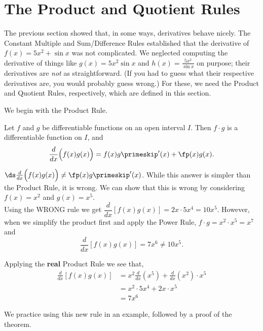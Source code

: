 \section{The Product and Quotient Rules}\label{sec:prod_quot_rules}

The previous section showed that, in some ways, derivatives behave nicely. The Constant Multiple and Sum/Difference Rules established that the derivative of $f(x) = 5x^2+\sin x $ was not complicated. We neglected computing the derivative of things like $g(x) = 5x^2\sin x$ and $h(x) = \frac{5x^2}{\sin x}$ on purpose; their derivatives are \emph{not} as straightforward. (If you had to guess what their respective derivatives are, you would probably guess wrong.) For these, we need the Product and Quotient Rules, respectively, which are defined in this section. 

We begin with the Product Rule.

\begin{theorem}\label{thm:ProductRule}
Let $f$ and $g$ be differentiable functions on an open interval $I$. Then $f\cdot g$ is a differentiable function on $I$, and \[\frac{d}{dx}\Bigl(f(x)g(x)\Bigr) = f(x)g\primeskip'(x) + \fp(x)g(x).\]
\end{theorem}

 $\ds\frac{d}{dx}\Bigl(f(x)g(x)\Bigr) \neq \fp(x)g\primeskip'(x)$. While this answer is simpler than the Product Rule, it is wrong.  We can show that this is wrong by considering \\
$f(x)=x^2$ and $g(x)=x^5$. \\
Using the WRONG rule we get $\dfrac{d}{dx}[f(x)g(x)] =2x \cdot 5x^4 = 10x^5$. However, when we simplify the product first and apply the Power Rule, $f \cdot g = x^2 \cdot x^5 = x^7$ and 
\[\frac{d}{dx}[f(x)g(x)] = 7x^6 \neq 10x^5.\]

Applying the \textbf{real} Product Rule we see that,
\begin{align*}
\frac{d}{dx}[f(x)g(x)]
& = x^2 \frac{d}{dx} (x^5) + \frac{d}{dx} (x^2) \cdot x^5 \\ 
& = x^2 \cdot 5x^4+2x \cdot x^5 \\ 
&= 7x^6
\end{align*}


We practice using this new rule in an example, followed by a proof of the theorem.

